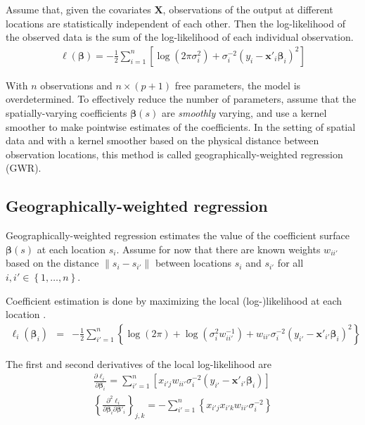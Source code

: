 \documentclass[authoryear, review, 11pt]{elsarticle}
\begin{document}
	Assume that, given the covariates $\bm{X}$, observations of the output at different locations are statistically independent of each other. Then the log-likelihood of the observed data is the sum of the log-likelihood of each individual observation.
	 \begin{eqnarray}
	 	\ell\left( \bm{\beta} \right) = - \frac{1}{2} \sum_{i=1}^n \left[  \log \left( 2 \pi \sigma^2_i\right) +  \sigma^{-2}_i  \left(y_i - \bm{x}'_i\bm{\beta}_i \right)^2  \right]
	\end{eqnarray}
	
	With $n$ observations and $n \times (p+1)$ free parameters, the model is overdetermined. To effectively reduce the number of parameters, assume that the spatially-varying coefficients $\bm{\beta}(s)$ are \emph{smoothly} varying, and use a kernel smoother to make pointwise estimates of the coefficients. In the setting of spatial data and with a kernel smoother based on the physical distance between observation locations, this method is called geographically-weighted regression (GWR).
		
	\subsection{Geographically-weighted regression}
	Geographically-weighted regression estimates the value of the coefficient surface $\bm{\beta}(s)$ at each location $s_i$. Assume for now that there are known weights $w_{ii'}$ based on the distance $\|s_i  -s_{i'}\|$ between locations $s_i$ and $s_{i'}$ for all $i, i' \in \left\{1, \dots, n\right\}$.
	
	Coefficient estimation is done by maximizing the local (log-)likelihood at each location \citep{Fotheringham:2002}.	
	\begin{eqnarray}
		\ell_i\left(\bm{\beta}_i\right) &=& - \frac{1}{2} \sum_{i'=1}^n \left\{ \log{\left(2 \pi\right)}  + \log{\left(\sigma^2_i w^{-1}_{ii'} \right)}  +  w_{ii'} \sigma^{-2}_i  \left(y_{i'} - \bm{x}'_{i'} \bm{\beta}_i \right)^2 \right\}
	\end{eqnarray}
	
	The first and second derivatives of the local log-likelihood are
	\begin{eqnarray}
		\frac{\partial \ell_i}{\partial \bm{\beta}_i} =   \sum_{i'=1}^n \left[ x_{i'j} w_{ii'} \sigma^{-2}_i \left( y_{i'} - \bm{x}'_{i'} \bm{\beta}_i \right) \right] \\
		\left\{\frac{\partial^2 \ell_i}{\partial \bm{\beta}_i \partial \bm{\beta}'_i} \right\}_{j,k} = -\sum_{i'=1}^n \left\{ x_{i'j} x_{i'k} w_{ii'} \sigma^{-2}_i \right\}
	\end{eqnarray}
	
\end{document}
